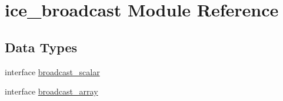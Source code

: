 \hypertarget{namespaceice__broadcast}{
\section{ice\_\-broadcast Module Reference}
\label{namespaceice__broadcast}
}
\subsection*{Data Types}
\begin{DoxyCompactItemize}
\item 
interface \hyperlink{interfaceice__broadcast_1_1broadcast__scalar}{broadcast\_\-scalar}
\item 
interface \hyperlink{interfaceice__broadcast_1_1broadcast__array}{broadcast\_\-array}
\end{DoxyCompactItemize}
